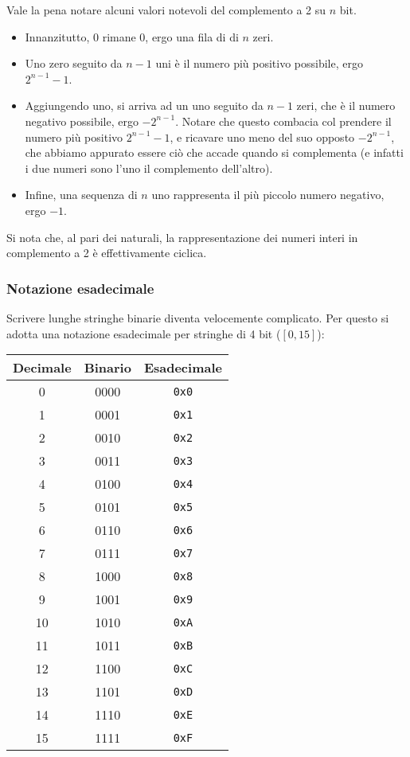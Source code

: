 \documentclass[a4paper,11pt]{article}
\begin{document}
Vale la pena notare alcuni valori notevoli del complemento a 2 su $n$ bit.
\begin{itemize}
	\item Innanzitutto, 0 rimane 0, ergo una fila di di $n$ zeri.
	\item Uno zero seguito da $n-1$ uni è il numero più positivo possibile, ergo $2^{n-1} -1$.
	\item Aggiungendo uno, si arriva ad un uno seguito da $n - 1$ zeri, che è il numero negativo possibile, ergo $-2^{n-1}$. 
		Notare che questo combacia col prendere il numero più positivo $2^{n-1} -1$, e ricavare uno meno del suo opposto $-2^{n-1}$, che abbiamo appurato essere ciò che accade quando si complementa (e infatti i due numeri sono l'uno il complemento dell'altro).
	\item Infine, una sequenza di $n$ uno rappresenta il più piccolo numero negativo, ergo $-1$.
\end{itemize}

Si nota che, al pari dei naturali, la rappresentazione dei numeri interi in complemento a 2 è effettivamente ciclica.

\subsubsection{Notazione esadecimale}
Scrivere lunghe stringhe binarie diventa velocemente complicato. 
Per questo si adotta una notazione esadecimale per stringhe di 4 bit ($[0, 15]$):

\begin{table}[h!]
    \centering
    \begin{tabular}{ c | c | c }
        \bfseries Decimale & \bfseries Binario & \bfseries Esadecimale \\
        \hline
        0  & 0000 & \texttt{0x0} \\
        1  & 0001 & \texttt{0x1} \\
        2  & 0010 & \texttt{0x2} \\
        3  & 0011 & \texttt{0x3} \\
        4  & 0100 & \texttt{0x4} \\
        5  & 0101 & \texttt{0x5} \\
        6  & 0110 & \texttt{0x6} \\
        7  & 0111 & \texttt{0x7} \\
        8  & 1000 & \texttt{0x8} \\
        9  & 1001 & \texttt{0x9} \\
        10 & 1010 & \texttt{0xA} \\
        11 & 1011 & \texttt{0xB} \\
        12 & 1100 & \texttt{0xC} \\
        13 & 1101 & \texttt{0xD} \\
        14 & 1110 & \texttt{0xE} \\
        15 & 1111 & \texttt{0xF} \\
    \end{tabular}
\end{table}
\end{document}
